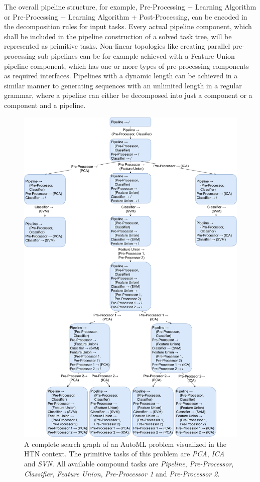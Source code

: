 The overall pipeline structure, for example, Pre-Processing + Learning Algorithm or Pre-Processing + Learning Algorithm + Post-Processing, can be encoded in the decomposition rules for input tasks.
Every actual pipeline component, which shall be included in the pipeline construction of a solved task tree, will be represented as primitive tasks.\newline
Non-linear topologies like creating parallel pre-processing sub-pipelines can be for example achieved with a Feature Union pipeline component, which has one or more types of pre-processing components as required interfaces.
Pipelines with a dynamic length can be achieved in a similar manner to generating sequences with an unlimited length in a regular grammar, where a pipeline can either be decomposed into just a component or a component and a pipeline.
\begin{figure}[ht!]
    \centering
    \includegraphics[width=\textwidth]{gfx/Figures/Approach/HTNAutoML.pdf}
    \caption[A complete search graph of an AutoML problem visualized in the HTN context.]{A complete search graph of an AutoML problem visualized in the HTN context. The primitive tasks of this problem are \textit{PCA}, \textit{ICA} and \textit{SVN}.
    All available compound tasks are \textit{Pipeline}, \textit{Pre-Processor}, \textit{Classifier}, \textit{Feature Union}, \textit{Pre-Processor 1} and \textit{Pre-Processor 2}.}
    \label{fig:approach:htn-automl}
\end{figure}

